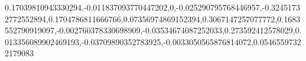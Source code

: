 0.17039810943330294,-0.011837093770447202,0,-0.025290795768446957,-0.32451732772552894,0.1704786811666766,0.07356974869152394,0.3067147257077772,0.1683552790919097,-0.002760378330698909,-0.03534674087252033,0.273592412578029,0.013356089902469193,-0.03709890352783925,-0.0033050565876814072,0.05465597322179083